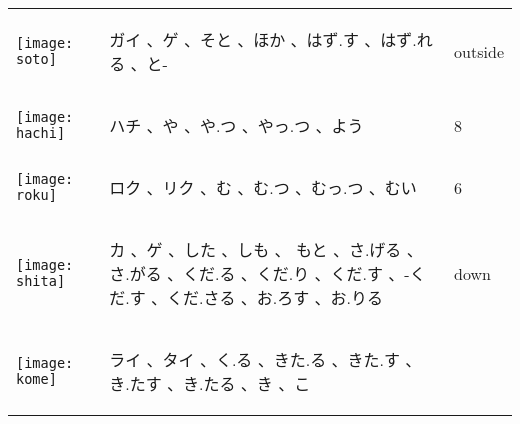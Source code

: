 \documentclass[a4paper,12pt]{extarticle}
\begin{document}
\begin{longtable}{|lp{6cm}p{4cm}|}
\begin{minipage}{0.3\textwidth}
\centerline{
	\texttt{[image: soto]}
}
\end{minipage}
&
\begin{CJK}{UTF8}{min} ガイ 、ゲ 、そと 、ほか 、はず.す 、はず.れる 、と-\end{CJK}
&
 outside
\\ 
\begin{minipage}{0.3\textwidth}
\centerline{
	\texttt{[image: hachi]}
}
\end{minipage}
&
\begin{CJK}{UTF8}{min} ハチ 、や 、や.つ 、やっ.つ 、よう\end{CJK}
&
 8
\\ 
\begin{minipage}{0.3\textwidth}
\centerline{
	\texttt{[image: roku]}
}
\end{minipage}
&
\begin{CJK}{UTF8}{min} ロク 、リク 、む 、む.つ 、むっ.つ 、むい\end{CJK}
&
 6
\\ 
\begin{minipage}{0.3\textwidth}
\centerline{
	\texttt{[image: shita]}
}
\end{minipage}
&
\begin{CJK}{UTF8}{min} カ 、ゲ 、した 、しも 、 もと 、さ.げる 、さ.がる 、くだ.る 、くだ.り 、くだ.す 、-くだ.す 、くだ.さる 、お.ろす 、お.りる\end{CJK}
&
 down
\\ 
\begin{minipage}{0.3\textwidth}
\centerline{
	\texttt{[image: kome]}
}
\end{minipage}
&
\begin{CJK}{UTF8}{min} ライ 、タイ 、く.る 、きた.る 、きた.す 、き.たす 、き.たる 、き 、こ\end{CJK}

\end{longtable}
\end{document}
